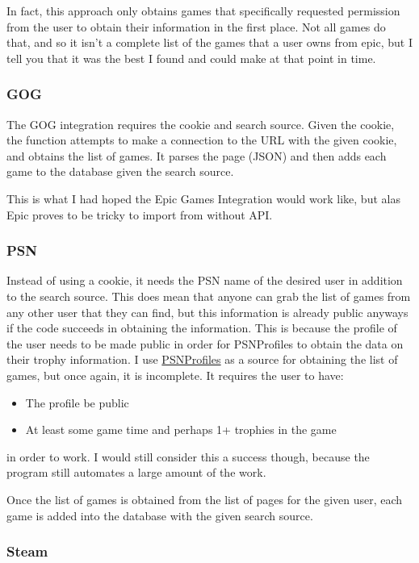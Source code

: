 In fact, this approach only obtains games that specifically requested
permission from the user to obtain their information in the first place.
Not all games do that, and so it isn't a complete list of the games
that a user owns from epic, but I tell you that it was the best I
found and could make at that point in time.

\subsubsection{GOG}
\label{subsubsec:GOGInt}

The GOG integration requires the cookie and search source. Given the
cookie, the function attempts to make a connection to the URL with
the given cookie, and obtains the list of games. It parses the page (JSON)
and then adds each game to the database given the search source.

This is what I had hoped the Epic Games Integration would work like,
but alas Epic proves to be tricky to import from without API.

\subsubsection{PSN}
\label{subsubsec:PSNInt}

Instead of using a cookie, it needs the PSN name of the desired
user in addition to the search source. This does mean that anyone can
grab the list of games from any
other user that they can find, but this information is already public
anyways if the code succeeds in obtaining the information. This is
because the profile of the user needs to be made public in order for
PSNProfiles to obtain the data on their trophy information. I use
\href{https://psnprofiles.com/}{PSNProfiles} as a source for
obtaining the list of games, but once
again, it is incomplete.
It requires the user to have:
\begin{itemize}
	\item The profile be public
	\item At least some game time and perhaps 1+ trophies in the game
\end{itemize}
in order to work. I would still consider this a success though,
because the program still automates a large amount of the work.

Once the list of games is obtained from the list of pages for the
given user, each game is added into the database with the given search source.

\subsubsection{Steam}
\label{subsubsec:SteamInt}

